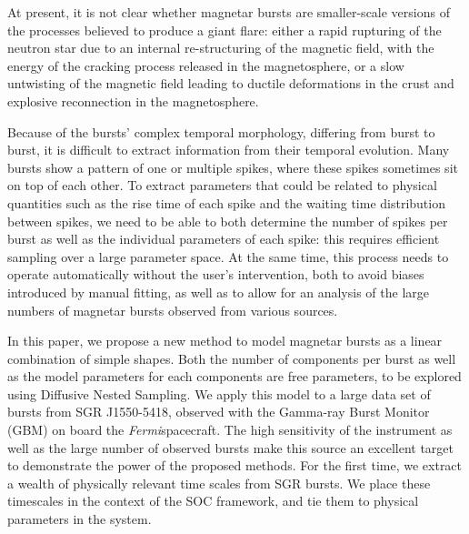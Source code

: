 \documentclass[12pt]{emulateapj}
\newcommand{\project}[1]{\textsl{#1}}
\newcommand{\fermi}{\project{Fermi}}
\begin{document}
At present, it is not clear whether magnetar bursts are smaller-scale versions of the processes believed to produce a giant flare:
either a rapid rupturing of the neutron star due to an internal re-structuring of the magnetic field, with the energy of the cracking process
released in the magnetosphere, or a slow untwisting of the magnetic field leading to ductile deformations in the crust and explosive 
reconnection in the magnetosphere.


Because of the bursts' complex temporal morphology, differing from burst to burst, it is difficult to extract information from their temporal evolution. 
Many bursts show a pattern of one or multiple spikes, where these spikes sometimes sit on top of each other. To extract parameters that could be related
to physical quantities such as the rise time of each spike and the waiting time distribution between spikes, we need to be able to both determine the 
number of spikes per burst as well as the individual parameters of each spike: this requires efficient sampling over a large parameter space.
At the same time, this process needs to operate automatically without the user's intervention, both to avoid biases introduced by manual fitting, as well as
 to allow for an analysis of the large numbers of magnetar bursts observed from various sources.

In this paper, we propose a new method to model magnetar bursts as a linear combination of simple shapes. Both the number of components
per burst as well as the model parameters for each components are free parameters, to be explored using Diffusive Nested Sampling.
We apply this model to a large data set of bursts from SGR J1550-5418, observed with the Gamma-ray Burst Monitor (GBM) on board the \fermi spacecraft.
The high sensitivity of the instrument as well as 
the large number of observed bursts make this source an excellent target to demonstrate the power of the proposed methods. For the first time, 
we extract a wealth of physically relevant time scales from SGR bursts. 
We place these timescales in the context of the SOC framework, and tie them to physical parameters in the system.
\end{document}
